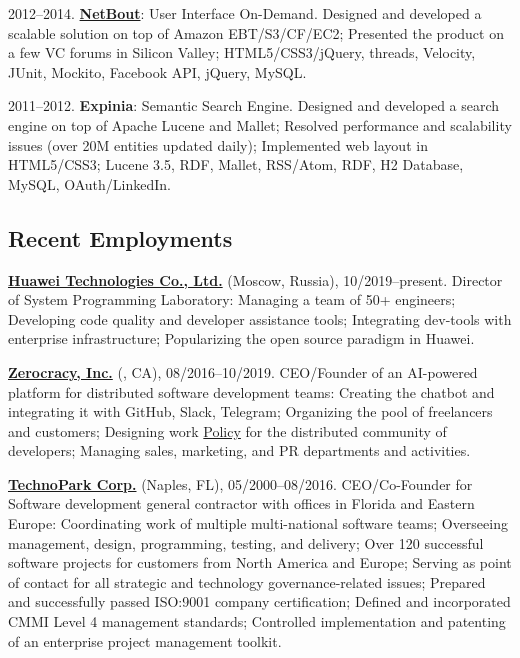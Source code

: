 \documentclass{yb}
\begin{document}
    2012--2014. \href{https://www.netbout.com}{\textbf{NetBout}}: User Interface On-Demand.
    Designed and developed a scalable solution on top of Amazon EBT/S3/CF/EC2;
    Presented the product on a few VC forums in Silicon Valley;
    HTML5/CSS3/jQuery, threads, Velocity, JUnit, Mockito, Facebook API, jQuery, MySQL.

    2011--2012. \textbf{Expinia}: Semantic Search Engine.
    Designed and developed a search engine on top of Apache Lucene and Mallet;
    Resolved performance and scalability issues (over 20M entities updated daily);
    Implemented web layout in HTML5/CSS3;
    Lucene 3.5, RDF, Mallet, RSS/Atom, RDF, H2 Database, MySQL, OAuth/LinkedIn.

    \subsection*{Recent Employments}

    \textbf{\href{https://www.huawei.com}{Huawei Technologies Co., Ltd.}} (Moscow, Russia), 10/2019--present.
    Director of System Programming Laboratory:
    Managing a team of 50+ engineers;
    Developing code quality and developer assistance tools;
    Integrating dev-tools with enterprise infrastructure;
    Popularizing the open source paradigm in Huawei.

    \textbf{\href{https://www.zerocracy.com}{Zerocracy, Inc.}} (, CA), 08/2016--10/2019.
    CEO/Founder of an AI-powered platform for distributed software development teams:
    Creating the chatbot and integrating it with GitHub, Slack, Telegram;
    Organizing the pool of freelancers and customers;
    Designing work \href{https://www.zerocracy.com/policy.html}{Policy} for the distributed community of developers;
    Managing sales, marketing, and PR departments and activities.

    \textbf{\href{https://www.technoparkcorp.com}{TechnoPark Corp.}} (Naples, FL), 05/2000--08/2016.
    CEO/Co-Founder for Software development general contractor with offices in Florida and Eastern Europe:
    Coordinating work of multiple multi-national software teams;
    Overseeing management, design, programming, testing, and delivery;
    Over 120 successful software projects for customers from North America and Europe;
    Serving as point of contact for all strategic and technology governance-related issues;
    Prepared and successfully passed ISO:9001 company certification;
    Defined and incorporated CMMI Level 4 management standards;
    Controlled implementation and patenting of an enterprise project management toolkit.
\end{document}
